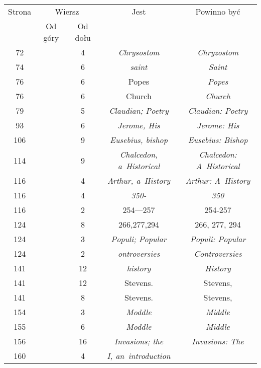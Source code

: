 \documentclass[a4paper,11pt]{article}
\numberwithin{equation}{section}
\begin{document}
\begin{center}
  \begin{tabular}{|c|c|c|c|c|}
    \hline
    Strona & \multicolumn{2}{c|}{Wiersz} & Jest
                              & Powinno być \\ \cline{2-3}
    & Od góry & Od dołu & & \\
    \hline
    \hphantom{0}72 & & \hphantom{0}4 & \textit{Chrysostom}
    & \textit{Chryzostom} \\
    \hphantom{0}74 & & \hphantom{0}6 & \textit{saint} & \textit{Saint} \\
    \hphantom{0}76 & & \hphantom{0}6 & Popes & \textit{Popes} \\
    \hphantom{0}76 & & \hphantom{0}6 & Church & \textit{Church} \\
    \hphantom{0}79 & & \hphantom{0}5 & \textit{Claudian; Poetry}
    & \textit{Claudian: Poetry} \\
    \hphantom{0}93 & & \hphantom{0}6 & \textit{Jerome, His}
    & \textit{Jerome: His} \\
    106 & & \hphantom{0}9 & \textit{Eusebius, bishop}
    & \textit{Eusebius: Bishop} \\
    114 & & \hphantom{0}9 & \textit{Chalcedon, a~Historical}
           & \textit{Chalcedon: A~Historical} \\
    116 & & \hphantom{0}4 & \textit{Arthur, a~History}
    & \textit{Arthur: A~History} \\
    116 & & \hphantom{0}4 & \textit{350-} & \textit{350} \\
    116 & & \hphantom{0}2 & 254---257 & 254-257 \\
    124 & & \hphantom{0}8 & 266,277,294 & 266, 277, 294 \\
    124 & & \hphantom{0}3 & \textit{Populi; Popular}
    & \textit{Populi: Popular} \\
    124 & & \hphantom{0}2 & \textit{ontroversies}
    & \textit{Controversies} \\
    141 & & 12 & \textit{history} & \textit{History} \\
    141 & & 12 & Stevens. & Stevens, \\
    141 & & \hphantom{0}8 & Stevens. & Stevens, \\
    154 & & \hphantom{0}3 & \textit{Moddle} & \textit{Middle} \\
    155 & & \hphantom{0}6 & \textit{Moddle} & \textit{Middle} \\
    156 & & 16 & \textit{Invasions; the} & \textit{Invasions: The} \\
    160 & & \hphantom{0}4 & \textit{I, an~introduction}

\end{tabular}
\end{center}
\end{document}
